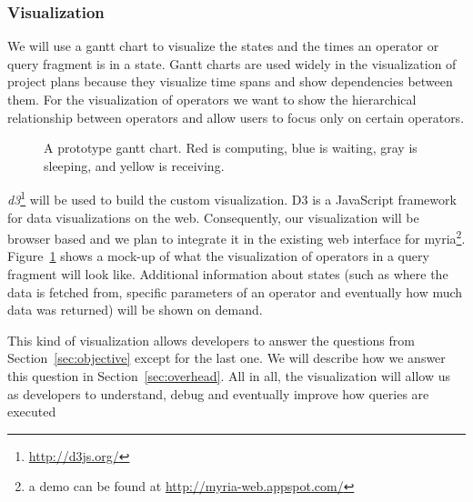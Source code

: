 \documentclass[11pt]{article}
\begin{document}

	\subsubsection{Visualization}

	We will use a gantt chart to visualize the states and the times an operator or query fragment is in a state. Gantt charts are used widely in the visualization of project plans because they visualize time spans and show dependencies between them. For the visualization of operators we want to show the hierarchical relationship between operators and allow users to focus only on certain operators.

\begin{figure}[h]
  \begin{center}
    \def\svgwidth{0.9\columnwidth}
    
  \end{center}
  \caption{A prototype gantt chart. Red is computing, blue is waiting, gray is sleeping, and yellow is receiving.}
  \label{fig:gantt}
\end{figure}

	\emph{d3}\footnote{\url{http://d3js.org/}} will be used to build the custom visualization. D3 is a JavaScript framework for data visualizations on the web. Consequently, our visualization will be browser based and we plan to integrate it in the existing web interface for myria\footnote{a demo can be found at \url{http://myria-web.appspot.com/}}. Figure~\ref{fig:gantt} shows a mock-up of what the visualization of operators in a query fragment will look like. Additional information about states (such as where the data is fetched from, specific parameters of an operator and eventually how much data was returned) will be shown on demand.

	This kind of visualization allows developers to answer the questions from Section~\ref{sec:objective} except for the last one. We will describe how we answer this question in Section~\ref{sec:overhead}. All in all, the visualization will allow us as developers to understand, debug and eventually improve how queries are executed

\end{document}

